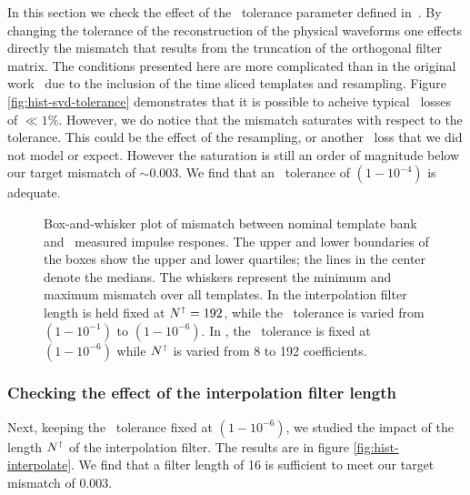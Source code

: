 In this section we check the effect of the \SVD\ tolerance parameter defined
in~\cite{Cannon:2010p10398}.  By changing the tolerance of the reconstruction of
the physical waveforms one effects directly the mismatch that results from the
truncation of the orthogonal filter matrix.  The conditions presented here are
more complicated than in the original work~\cite{Cannon:2010p10398} due to the
inclusion of the time sliced templates and resampling.    Figure \ref{fig:hist-svd-tolerance}
demonstrates that it is possible to acheive typical \SNR\ losses of $\ll1\%$.
However, we do notice that the mismatch saturates with respect to the tolerance.
This could be the effect of the resampling, or another \SNR\ loss that we did
not model or expect.  However the saturation is still an order of magnitude below our target mismatch of $\sim$0.003.  We find that an \SVD\ tolerance of
$\left(1-10^{-4}\right)$ is adequate. 
%
\begin{figure}
	\begin{center}
		\caption{Box-and-whisker plot of mismatch between nominal
template bank and \lloid\ measured impulse respones.  The upper and lower boundaries of
the boxes show the upper and lower quartiles; the lines in the center denote the medians.
The whiskers represent the minimum and maximum mismatch over all templates.  In 
 the interpolation filter length is held fixed
at $N^\shortuparrow = 192$, while the \SVD\ tolerance is varied from
$\left(1-10^{-1}\right)$ to $\left(1-10^{-6}\right)$.  In , the \SVD\ tolerance is fixed at $\left(1-10^{-6}\right)$ while $N^\shortuparrow$ is varied from 8 to 192 coefficients.}
	\end{center}
\end{figure}

\subsubsection{Checking the effect of the interpolation filter length}

Next, keeping the \SVD\ tolerance fixed at $\left(1-10^{-6}\right)$, we studied the
impact of the length $N^\shortuparrow$ of the interpolation filter.  The results are in
figure \ref{fig:hist-interpolate}.  We find that a filter length of 16 is sufficient
to meet our target mismatch of 0.003.



